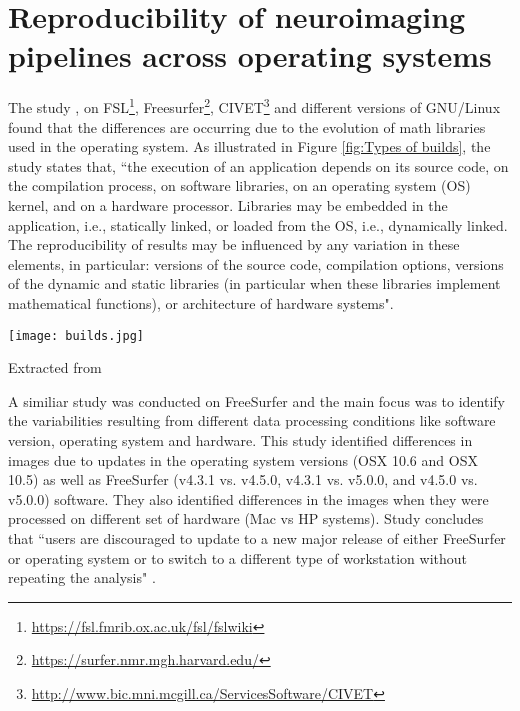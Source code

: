 \section{Reproducibility of neuroimaging pipelines across operating systems}

The study \cite{Gla15}, on FSL\footnote{\url{https://fsl.fmrib.ox.ac.uk/fsl/fslwiki}}, Freesurfer\footnote{\url{https://surfer.nmr.mgh.harvard.edu/}}, CIVET\footnote{\url{http://www.bic.mni.mcgill.ca/ServicesSoftware/CIVET}} and different versions of GNU/Linux found that the differences  are occurring due to the evolution of math libraries used in the operating system. As illustrated in Figure \ref{fig:Types of builds}, the study \cite{Gla15} states that, ``the execution of an application depends on its source code, on the compilation process, on software libraries, on an operating system (OS) kernel, and on a hardware processor. Libraries may be embedded in the application, i.e., statically linked, or loaded from the OS, i.e., dynamically linked. The reproducibility of results may be influenced by any variation in these elements, in particular: versions of the source code, compilation options, versions of the dynamic and static libraries (in particular when these libraries implement mathematical functions), or architecture of hardware systems".

\begin{center}
\texttt{[image: builds.jpg]}
\label{fig:Types of builds}
\caption*{Extracted from \cite{Gla15}}
\end{center}

A similiar study \cite{10.1371/journal.pone.0038234} was conducted on FreeSurfer and the main focus was to identify the variabilities resulting from different data processing conditions like software version, operating system and hardware. This study identified differences in images due to updates in the operating system versions (OSX 10.6 and OSX 10.5) as well as FreeSurfer (v4.3.1 vs. v4.5.0, v4.3.1 vs. v5.0.0, and v4.5.0 vs. v5.0.0) software. They also identified differences in the images when they were processed on different set of hardware (Mac vs HP systems). Study concludes that ``users are discouraged to update to a new major release of either FreeSurfer or operating system or to switch to a different type of workstation without repeating the analysis" \cite{10.1371/journal.pone.0038234}. 


